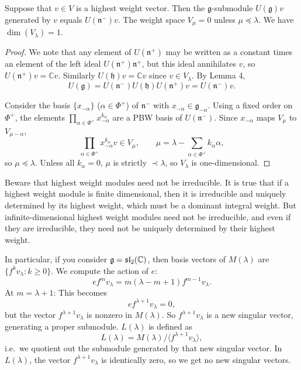 \documentclass[12pt]{article}
\begin{document}
\begin{proposition}
    Suppose that $v \in V$ is a highest weight vector. Then the $\mathfrak{g}$-submodule $U(\mathfrak{g})v$ generated by $v$ equals $U(\mathfrak{n}^-)v$. The weight space $V_\mu = 0$ unless $\mu \preceq \lambda$. We have $\dim(V_\lambda) = 1$.
\end{proposition}

\begin{proof}
    We note that any element of $U(\mathfrak{n}^+)$ may be written as a constant times an element of the left ideal $U(\mathfrak{n}^+)\mathfrak{n}^+$, but this ideal annihilates $v$, so $U(\mathfrak{n}^+)v = \mathbb{C}v$. Similarly $U(\mathfrak{h})v = \mathbb{C}v$ since $v \in V_\lambda$. By Lemma 4,
    \[
        U(\mathfrak{g}) = U(\mathfrak{n}^-)U(\mathfrak{h})U(\mathfrak{n}^+)v = U(\mathfrak{n}^-)v.
    \]

    Consider the basis $\{x_{-\alpha}\}$ ($\alpha \in \Phi^+$) of $\mathfrak{n}^-$ with $x_{-\alpha} \in \mathfrak{g}_{-\alpha}$. Using a fixed order on $\Phi^+$, the elements $\prod_{\alpha \in \Phi^+} x_{-\alpha}^{k_\alpha}$ are a PBW basis of $U(\mathfrak{n}^-)$. Since $x_{-\alpha}$ maps $V_\mu$ to $V_{\mu-\alpha}$,
    \[
        \prod_{\alpha \in \Phi^+} x_{-\alpha}^{k_\alpha} v \in V_\mu,
        \qquad \mu = \lambda - \sum_{\alpha \in \Phi^+} k_\alpha \alpha,
    \]
    so $\mu \preceq \lambda$. Unless all $k_\alpha = 0$, $\mu$ is strictly $\prec \lambda$, so $V_\lambda$ is one-dimensional.
\end{proof}

\begin{remark}
    Beware that highest weight modules need not be irreducible. It is true that if a highest weight module is finite dimensional, then it is irreducible and uniquely determined by its highest weight, which must be a dominant integral weight. But infinite-dimensional highest weight modules need not be irreducible, and even if they are irreducible, they need not be uniquely determined by their highest weight.

    In particular, if you consider $\mathfrak{g}  = \mathfrak{sl}_2(\mathbb{C})$, then basis vectors of $M(\lambda)$ are $\{ f^k v_\lambda : k \ge 0 \}$. We compute the action of $e$:
    \[
        e f^m v_\lambda = m (\lambda - m + 1) f^{m-1} v_\lambda.
    \]
    At $m = \lambda+1$:
    This becomes
    \[
        e f^{\lambda+1} v_\lambda = 0,
    \]
    but the vector $f^{\lambda+1} v_\lambda$ is nonzero in $M(\lambda)$.
    So $f^{\lambda+1} v_\lambda$ is a new singular vector, generating a proper submodule. $L(\lambda)$ is defined as
    \[
        L(\lambda) = M(\lambda) \big/ \langle f^{\lambda+1} v_\lambda \rangle,
    \]
    i.e.\ we quotient out the submodule generated by that new singular vector. In $L(\lambda)$, the vector $f^{\lambda+1} v_\lambda$ is identically zero, so we get no new singular vectors.
\end{remark}
\end{document}
